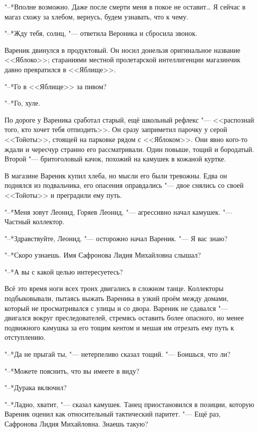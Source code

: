 "--*Вполне возможно.
Даже после смерти меня в покое не оставит\ldots{}
Я сейчас в магаз схожу за хлебом, вернусь, будем узнавать, что к чему.

"--*Жду тебя, солнц, "--- ответила Вероника и сбросила звонок.

Вареник двинулся в продуктовый.
Он носил донельзя оригинальное название <<Яблоко>>;
стараниями местной пролетарской интеллигенции магазинчик давно превратился в <<Яблище>>.

"--*Го в <<Яблище>> за пивом?

"--*Го, хуле.

По дороге у Вареника сработал старый, ещё школьный рефлекс "--- <<распознай того, кто хочет тебя отпиздить>>.
Он сразу заприметил парочку у серой <<Тойоты>>, стоящей на парковке рядом с <<Яблоком>>.
Они явно кого-то ждали и чересчур странно его рассматривали.
Один повыше, тощий и бородатый.
Второй "--- бритоголовый качок, похожий на камушек в кожаной куртке.

В магазине Вареник купил хлеба, но мысли его были тревожны.
Едва он поднялся из подвальчика, его опасения оправдались "--- двое снялись со своей <<Тойоты>> и преградили ему путь.

\asterism

"--*Меня зовут Леонид, Горяев Леонид, "--- агрессивно начал камушек.
"--- Частный коллектор.

"--*Здравствуйте, Леонид, "--- осторожно начал Вареник.
"--- Я вас знаю?

"--*Скоро узнаешь.
Имя Сафронова Лидия Михайловна слышал?

"--*А вы с какой целью интересуетесь?

Всё это время ноги всех троих двигались в сложном танце.
Коллекторы подбыковывали, пытаясь выжать Вареника в узкий проём между домами, который не просматривался с улицы и со двора.
Вареник не сдавался "--- двигался вокруг преследователей, стремясь оставить более опасного, но менее подвижного камушка за его тощим кентом и мешая им отрезать ему путь к отступлению.

"--*Да не прыгай ты, "--- нетерпеливо сказал тощий.
"--- Боишься, что ли?

"--*Можете пояснить, что вы имеете в виду?

"--*Дурака включил?

"--*Ладно, хватит, "--- сказал камушек.
Танец приостановился в позиции, которую Вареник оценил как относительный тактический паритет.
"--- Ещё раз, Сафронова Лидия Михайловна.
Знаешь такую?

